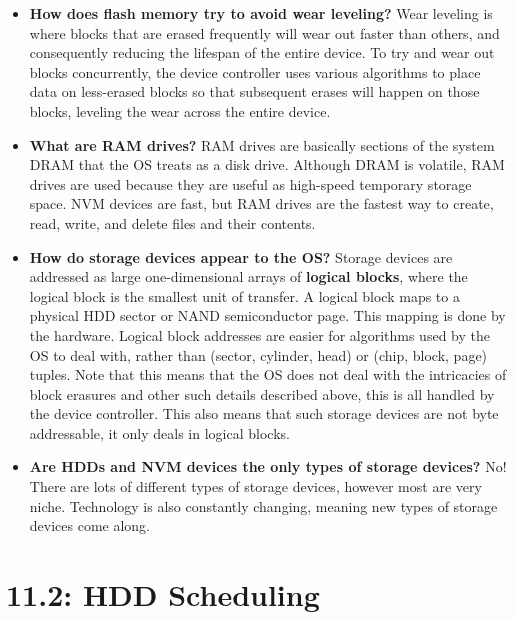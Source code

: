 \documentclass[12pt]{article}
\begin{document}
\begin{itemize}
    \item \textbf{How does flash memory try to avoid wear leveling?} Wear leveling is where blocks that are erased frequently will wear out faster than others, and consequently reducing the lifespan of the entire device. To try and wear out blocks concurrently, the device controller uses various algorithms to place data on less-erased blocks so that subsequent erases will happen on those blocks, leveling the wear across the entire device.
    \item \textbf{What are RAM drives?} RAM drives are basically sections of the system DRAM that the OS treats as a disk drive. Although DRAM is volatile, RAM drives are used because they are useful as high-speed temporary storage space. NVM devices are fast, but RAM drives are the fastest way to create, read, write, and delete files and their contents.
    \item \textbf{How do storage devices appear to the OS?} Storage devices are addressed as large one-dimensional arrays of \textbf{logical blocks}, where the logical block is the smallest unit of transfer. A logical block maps to a physical HDD sector or NAND semiconductor page. This mapping is done by the hardware. Logical block addresses are easier for algorithms used by the OS to deal with, rather than (sector, cylinder, head) or (chip, block, page) tuples. Note that this means that the OS does not deal with the intricacies of block erasures and other such details described above, this is all handled by the device controller. This also means that such storage devices are not byte addressable, it only deals in logical blocks.
    \item \textbf{Are HDDs and NVM devices the only types of storage devices?} No! There are lots of different types of storage devices, however most are very niche. Technology is also constantly changing, meaning new types of storage devices come along.
\end{itemize}

\section*{11.2: HDD Scheduling}
\end{document}
